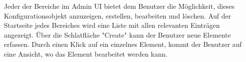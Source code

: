 Jeder der Bereiche im Admin UI bietet dem Benutzer die Möglichkeit, dieses Konfigurationsobjekt anzuzeigen, erstellen, bearbeiten und löschen.
Auf der Startseite jedes Bereiches wird eine Liste mit allen relevanten Einträgen angezeigt.
Über die Schlatfläche "Create" kann der Benutzer neue Elemente erfassen.
Durch einen Klick auf ein einzelnes Element, kommt der Benutzer auf eine Ansicht, wo das Element bearbeitet werden kann.

\clearpage
